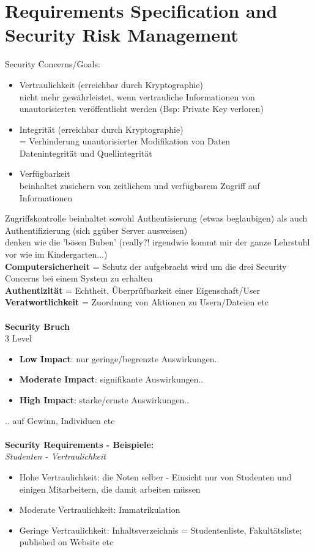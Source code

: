 \section{Requirements Specification and Security Risk Management}
Security Concerns/Goals: 
\begin{itemize}
	\item Vertraulichkeit (erreichbar durch Kryptographie)\\
	nicht mehr gewährleistet, wenn vertrauliche Informationen von unautorisierten veröffentlicht werden (Bsp: Private Key verloren)
	\item Integrität (erreichbar durch Kryptographie)\\
	= Verhinderung unautorisierter Modifikation von Daten\\
	Datenintegrität und Quellintegrität
	\item Verfügbarkeit\\
	beinhaltet zusichern von zeitlichem und verfügbarem Zugriff auf Informationen
\end{itemize}
Zugriffskontrolle beinhaltet sowohl Authentisierung (etwas beglaubigen) als auch Authentifizierung (sich ggüber Server ausweisen)\\
denken wie die 'bösen Buben' ({\tiny really?! irgendwie kommt mir der ganze Lehrstuhl vor wie im Kindergarten...})\\
\textbf{Computersicherheit} = Schutz der aufgebracht wird um die drei Security Concerns bei einem System zu erhalten\\
\textbf{Authentizität} = Echtheit, Überprüfbarkeit einer Eigenschaft/User\\
\textbf{Veratwortlichkeit} = Zuordnung von Aktionen zu Usern/Dateien etc\\
\\
\textbf{Security Bruch}\\
3 Level
\begin{itemize}
	\item \textbf{Low Impact}: nur geringe/begrenzte Auswirkungen..
	\item \textbf{Moderate Impact}: signifikante Auswirkungen..
	\item \textbf{High Impact}: starke/ernste Auswirkungen..
\end{itemize}
.. auf Gewinn, Individuen etc\\
\\
\textbf{Security Requirements  - Beispiele:}\\
\textit{Studenten - Vertraulichkeit}
\begin{itemize}
	\item Hohe Vertraulichkeit: die Noten selber - Einsicht nur von Studenten und einigen Mitarbeitern, die damit arbeiten müssen
	\item Moderate Vertraulichkeit: Immatrikulation
	\item Geringe Vertraulichkeit: Inhaltsverzeichnis = Studentenliste, Fakultätsliste; published on Website etc
\end{itemize}

